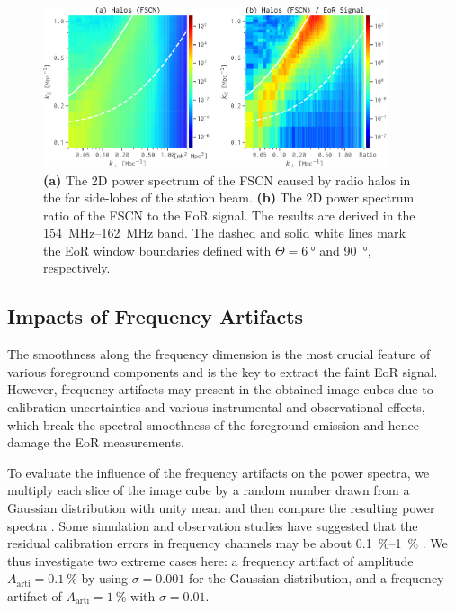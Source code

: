 \documentclass[twocolumn]{aastex62}
\newcommand{\R}[1]{\mathrm{#1}}
\begin{document}
\begin{figure}
  \centering
  \includegraphics[width=0.9\textwidth]{ps2d-fscn}
  \caption{\label{fig:ps2d-fscn}%
    \textbf{(a)} The 2D power spectrum of the FSCN caused by radio halos
    in the far side-lobes of the station beam.
    \textbf{(b)} The 2D power spectrum ratio of the FSCN to the EoR signal.
    The results are derived in the \SIrange{154}{162}{\MHz} band.
    The dashed and solid white lines mark the EoR window boundaries
    defined with $\Theta = \SI{6}{\degree}$ and \SI{90}{\degree},
    respectively.
  }
\end{figure}

\subsection{Impacts of Frequency Artifacts}
\label{sec:freq-artifacts}

The smoothness along the frequency dimension is the most crucial feature
of various foreground components and is the key to extract the faint EoR
signal.
However, frequency artifacts may present in the obtained image cubes due
to calibration uncertainties and various instrumental and observational
effects, which break the spectral smoothness of the foreground emission
and hence damage the EoR measurements.

To evaluate the influence of the frequency artifacts on the power
spectra, we multiply each slice of the image cube by a random number
drawn from a Gaussian distribution with unity mean and then compare
the resulting power spectra \citep{chapman2016}.
Some simulation and observation studies have suggested that the residual
calibration errors in frequency channels may be about
\SIrange{0.1}{1}{\percent}
\citep[e.g.,][]{barry2016,beardsley2016,ewallWice2017}.
We thus investigate two extreme cases here:
a frequency artifact of amplitude $A_{\R{arti}} = \SI{0.1}{\percent}$ by
using $\sigma = 0.001$ for the Gaussian distribution,
and a frequency artifact of $A_{\R{arti}} = \SI{1}{\percent}$ with
$\sigma = 0.01$.
\end{document}

